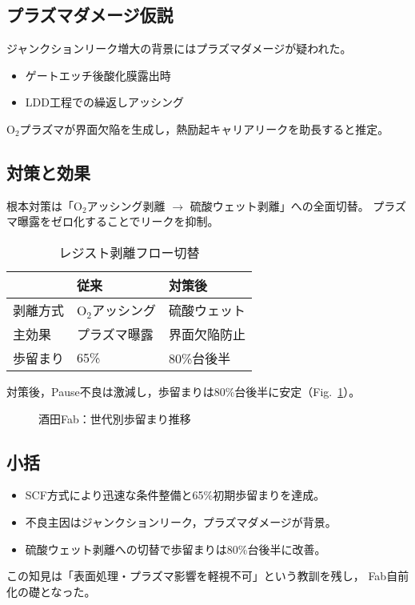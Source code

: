 \documentclass[conference]{IEEEtran}
\begin{document}
\subsection{プラズマダメージ仮説}
ジャンクションリーク増大の背景にはプラズマダメージが疑われた。
\begin{itemize}
  \item ゲートエッチ後酸化膜露出時
  \item LDD工程での繰返しアッシング
\end{itemize}
O$_2$プラズマが界面欠陥を生成し，熱励起キャリアリークを助長すると推定。

\subsection{対策と効果}
根本対策は「O$_2$アッシング剥離 $\rightarrow$ 硫酸ウェット剥離」への全面切替。
プラズマ曝露をゼロ化することでリークを抑制。

\begin{table}[h]
  \centering
  \caption{レジスト剥離フロー切替}
  \label{tab:resist}
  \begin{tabular}{lll}
    \toprule
    & 従来 & 対策後 \\
    \midrule
    剥離方式 & O$_2$アッシング & 硫酸ウェット \\
    主効果 & プラズマ曝露 & 界面欠陥防止 \\
    歩留まり & 65\% & 80\%台後半 \\
    \bottomrule
  \end{tabular}
\end{table}

対策後，Pause不良は激減し，歩留まりは80\%台後半に安定（Fig.~\ref{fig:yield25}）。

\begin{figure}[t]
\centering
{}
\caption{酒田Fab：世代別歩留まり推移}
\label{fig:yield25}
\end{figure}

\subsection{小括}
\begin{itemize}
  \item SCF方式により迅速な条件整備と65\%初期歩留まりを達成。
  \item 不良主因はジャンクションリーク，プラズマダメージが背景。
  \item 硫酸ウェット剥離への切替で歩留まりは80\%台後半に改善。
\end{itemize}
この知見は「表面処理・プラズマ影響を軽視不可」という教訓を残し，
Fab自前化の礎となった。
\end{document}
